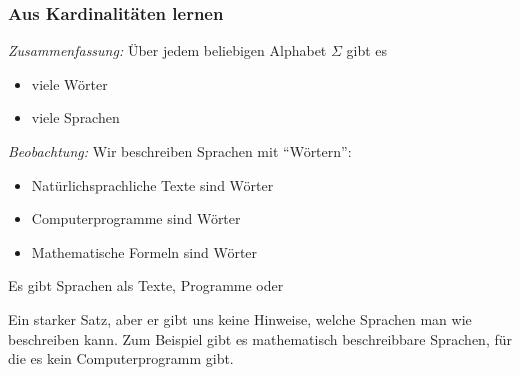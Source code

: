 \documentclass[onlymath]{beamer}
\begin{document}
\begin{frame}\frametitle{Aus Kardinalitäten lernen}

\emph{Zusammenfassung:} Über jedem beliebigen Alphabet $\Sigma$ gibt es
\begin{itemize}
\item {} viele Wörter
\item {} viele Sprachen
\end{itemize}
\bigskip\pause

\emph{Beobachtung:} Wir beschreiben Sprachen mit "`Wörtern"':
\begin{itemize}
\item Natürlichsprachliche Texte sind Wörter
\item Computerprogramme sind Wörter
\item Mathematische Formeln sind Wörter
\end{itemize}
Es gibt  Sprachen als Texte, Programme oder 
\pause
\bigskip


Ein starker Satz, aber er gibt uns keine Hinweise, welche Sprachen man wie beschreiben kann.
Zum Beispiel gibt es mathematisch beschreibbare Sprachen, für die es kein Computerprogramm gibt.

\end{frame}






\end{document}
